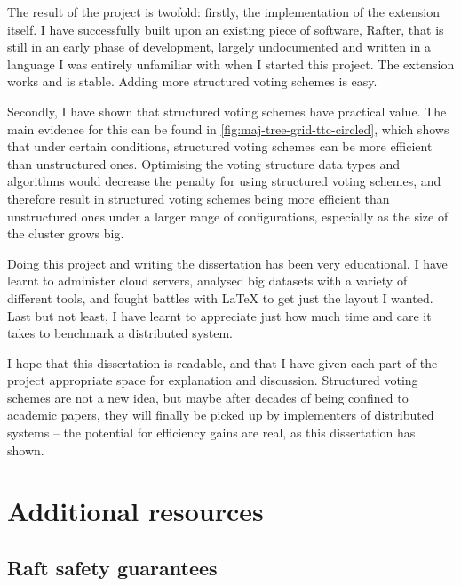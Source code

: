 \documentclass[12pt,chapterprefix=true,toc=bibliography,numbers=noendperiod,
               footnotes=multiple,twoside]{scrreprt}
\begin{document}

The result of the project is twofold: firstly, the implementation of the extension itself. I have successfully built upon an existing piece of software, Rafter, that is still in an early phase of development, largely undocumented and written in a language I was entirely unfamiliar with when I started this project. The extension works and is stable. Adding more structured voting schemes is easy.

Secondly, I have shown that structured voting schemes have practical value. The main evidence for this can be found in \cref{fig:maj-tree-grid-ttc-circled}, which shows that under certain conditions, structured voting schemes can be more efficient than unstructured ones. Optimising the voting structure data types and algorithms would decrease the penalty for using structured voting schemes, and therefore result in structured voting schemes being more efficient than unstructured ones under a larger range of configurations, especially as the size of the cluster grows big.


Doing this project and writing the dissertation has been very educational. I have learnt to administer cloud servers, analysed big datasets with a variety of different tools, and fought battles with \LaTeX{} to get just the layout I wanted. Last but not least, I have learnt to appreciate just how much time and care it takes to benchmark a distributed system.


I hope that this dissertation is readable, and that I have given each part of the project appropriate space for explanation and discussion. Structured voting schemes are not a new idea, but maybe after decades of being confined to academic papers, they will finally be picked up by implementers of distributed systems -- the potential for efficiency gains are real, as this dissertation has shown.


\printbibliography


\appendix



\chapter{Additional resources}

\section{Raft safety guarantees}
\label{sc:rafter-safety}
\end{document}
